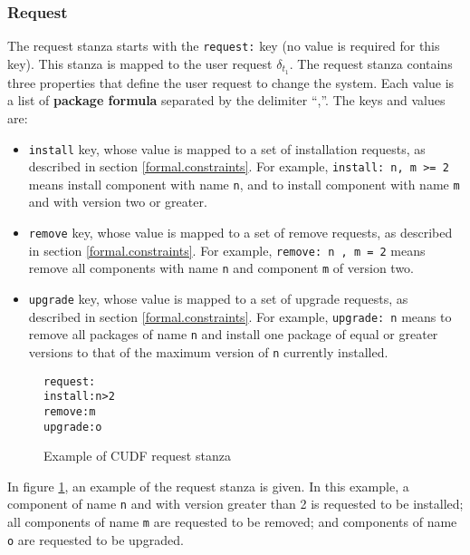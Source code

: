 \subsubsection{Request}
\label{formal.cudfdes.request}
The request stanza starts with the \verb+request:+ key (no value is required for this key).
This stanza is mapped to the user request $\delta_{t_1}$.
The request stanza contains three properties that define the user request to change the system.
Each value is a list of \textbf{package formula} separated by the delimiter ``,''.
The keys and values are:
\begin{itemize}
  \item \verb+install+ key, whose value is mapped to a set of installation requests, as described in section \ref{formal.constraints}.
  For example, \verb+install: n, m >= 2+ means install component with name \verb+n+, and to install component with name \verb+m+ and with version two or greater.
  \item \verb+remove+ key, whose value is mapped to a set of remove requests, as described in section \ref{formal.constraints}.
  For example, \verb+remove: n , m = 2+ means remove all components with name \verb+n+ and component \verb+m+ of version two.
  \item \verb+upgrade+ key, whose value is mapped to a set of upgrade requests, as described in section \ref{formal.constraints}.
  For example, \verb+upgrade: n+ means to remove all packages of name \verb+n+ and install one package of equal or greater versions to that of the maximum version of \verb+n+ currently installed. 
\end{itemize}


\begin{figure}[htp] 
\begin{center}
\begin{alltt}
request:
install: n > 2
remove: m
upgrade: o
\end{alltt}
  \caption{Example of CUDF request stanza}
  \label{formal.cudfrequeststanza}
\end{center}
\end{figure}

In figure \ref{formal.cudfrequeststanza}, an example of the request stanza is given.
In this example, a component of name \verb+n+ and with version greater than 2 is requested to be installed; all components of name \verb+m+ are requested to be removed;
and components of name \verb+o+ are requested to be upgraded.

